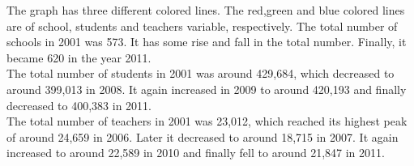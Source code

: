 \documentclass{article}\usepackage[]{graphicx}\usepackage[]{color}
\begin{document}
The graph has three different colored lines. The red,green and blue colored lines are of school, students and teachers variable, respectively. The total number of schools in 2001 was 573. It has some rise and fall in the total number. Finally, it became 620 in the year 2011.
\\The total number of students in 2001 was around 429,684, which decreased to around 399,013 in 2008. It again increased in 2009 to around 420,193 and finally decreased to 400,383 in 2011.
\\The total number of teachers in 2001 was 23,012, which reached its highest peak of around 24,659 in 2006. Later it decreased to around 18,715 in 2007. It again increased to around 22,589 in 2010 and finally fell to around 21,847 in 2011.
\end{document}

